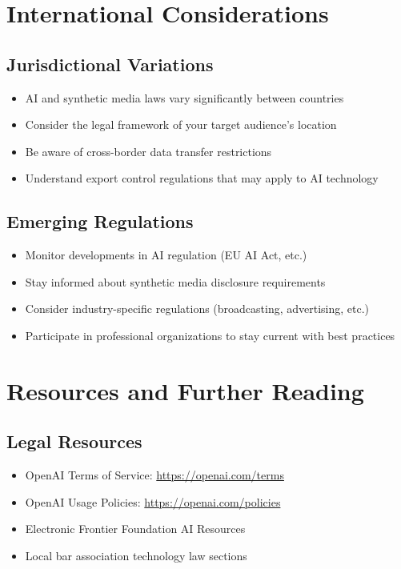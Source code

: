 \section{International Considerations}

\subsection{Jurisdictional Variations}
\begin{itemize}
\item AI and synthetic media laws vary significantly between countries
\item Consider the legal framework of your target audience's location
\item Be aware of cross-border data transfer restrictions
\item Understand export control regulations that may apply to AI technology
\end{itemize}

\subsection{Emerging Regulations}
\begin{itemize}
\item Monitor developments in AI regulation (EU AI Act, etc.)
\item Stay informed about synthetic media disclosure requirements
\item Consider industry-specific regulations (broadcasting, advertising, etc.)
\item Participate in professional organizations to stay current with best practices
\end{itemize}

\section{Resources and Further Reading}

\subsection{Legal Resources}
\begin{itemize}
\item OpenAI Terms of Service: \url{https://openai.com/terms}
\item OpenAI Usage Policies: \url{https://openai.com/policies}
\item Electronic Frontier Foundation AI Resources
\item Local bar association technology law sections
\end{itemize}

